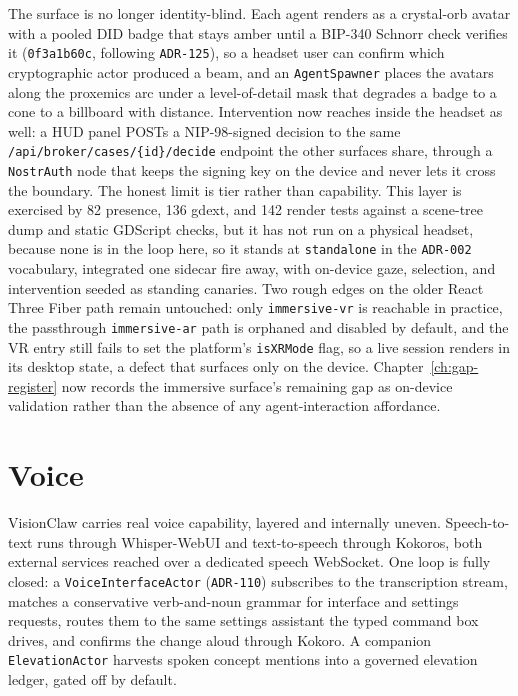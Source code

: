 The surface is no longer identity-blind. Each agent renders as a crystal-orb avatar with a pooled DID badge that stays amber until a BIP-340 Schnorr check verifies it (\texttt{0f3a1b60c}, following \texttt{ADR-125}), so a headset user can confirm which cryptographic actor produced a beam, and an \texttt{AgentSpawner} places the avatars along the proxemics arc under a level-of-detail mask that degrades a badge to a cone to a billboard with distance. Intervention now reaches inside the headset as well: a HUD panel POSTs a NIP-98-signed decision to the same \texttt{/api/broker/cases/\{id\}/decide} endpoint the other surfaces share, through a \texttt{NostrAuth} node that keeps the signing key on the device and never lets it cross the boundary. The honest limit is tier rather than capability. This layer is exercised by 82 presence, 136 gdext, and 142 render tests against a scene-tree dump and static GDScript checks, but it has not run on a physical headset, because none is in the loop here, so it stands at \texttt{standalone} in the \texttt{ADR-002} vocabulary, integrated one sidecar fire away, with on-device gaze, selection, and intervention seeded as standing canaries. Two rough edges on the older React Three Fiber path remain untouched: only \texttt{immersive-vr} is reachable in practice, the passthrough \texttt{immersive-ar} path is orphaned and disabled by default, and the VR entry still fails to set the platform's \texttt{isXRMode} flag, so a live session renders in its desktop state, a defect that surfaces only on the device. Chapter~\ref{ch:gap-register} now records the immersive surface's remaining gap as on-device validation rather than the absence of any agent-interaction affordance.

\section{Voice}

VisionClaw carries real voice capability, layered and internally uneven. Speech-to-text runs through Whisper-WebUI and text-to-speech through Kokoros, both external services reached over a dedicated speech WebSocket. One loop is fully closed: a \texttt{VoiceInterfaceActor} (\texttt{ADR-110}) subscribes to the transcription stream, matches a conservative verb-and-noun grammar for interface and settings requests, routes them to the same settings assistant the typed command box drives, and confirms the change aloud through Kokoro. A companion \texttt{ElevationActor} harvests spoken concept mentions into a governed elevation ledger, gated off by default.


